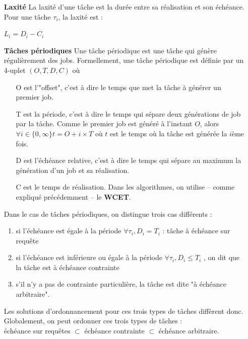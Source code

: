 \documentclass[11pt,a4paper,oneside]{report}
\begin{document}
\begin{itemize}
    \item[\textbf{Laxité}] La laxité d'une tâche est la durée entre sa réalisation et son échéance. 
    Pour une tâche $\tau_i$, la laxité est :
    \begin{center}
        $L_i = D_i - C_i$
    \end{center}
    \vspace{0.5cm}
    \item[\textbf{Tâches périodiques}]
    Une tâche périodique est une tâche qui génère régulièrement des jobs.  
    Formellement, une tâche périodique est définie par un 4-uplet $(O, T, D, C)$ où 
    \begin{itemize}
        \item[O] est l'"offset", c'est à dire le temps que met la tâche à générer un premier job.
        \item[T] est la période, c'est à dire le temps qui sépare deux générations de job par la tâche. 
        Comme le premier job est généré à l'instant $O$, alors $\forall i \in \{0, \infty \} t = O + i\times T$ 
        où $t$ est le temps où la tâche est générée la $i$ème fois.
        \item[D] est l'échéance relative, c'est à dire le temps qui sépare au maximum la génération 
        d'un job et sa réalisation.
        \item[C] est le temps de réalisation. Dans les algorithmes, on utilise -- comme expliqué précédemment -- le \textbf{WCET}.
    \end{itemize}	
    Dans le cas de tâches périodiques, on distingue trois cas différents : \\
    \begin{enumerate}
        \item si l'échéance est égale à la période $\forall \tau_i, D_i = T_i$ : tâche à \label{echeancesurrequete}échéance sur requête
        \item si l'échéance est inférieure ou égale à la période $\forall \tau_i, D_i \leq T_i $ , on dit que la tâche est à \label{echeancecontrainte} échéance contrainte
        \item s'il n'y a pas de contrainte particulière, la tâche est dite "à échéance arbitraire".
    \end{enumerate}
    Les solutions d'ordonnancement pour ces trois types de tâches diffèrent donc. 
    Globalement, on peut ordonner ces trois types de tâches : \\
    échéance sur requêtes $\subset$ échéance contrainte $\subset$ échéance arbitraire.
    

\end{itemize}
\end{document}
